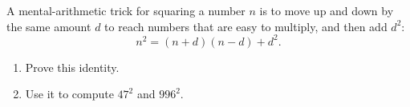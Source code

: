A mental-arithmetic trick for squaring a number $n$ is to move up and down by the same amount $d$ to reach numbers that are easy to multiply, and then add $d^2$:
\[
n^2=(n+d)(n-d)+d^2 .
\]
\begin{enumerate}
\item[(a)] Prove this identity.
\item[(b)] Use it to compute $47^2$ and $996^2$.
\end{enumerate}
